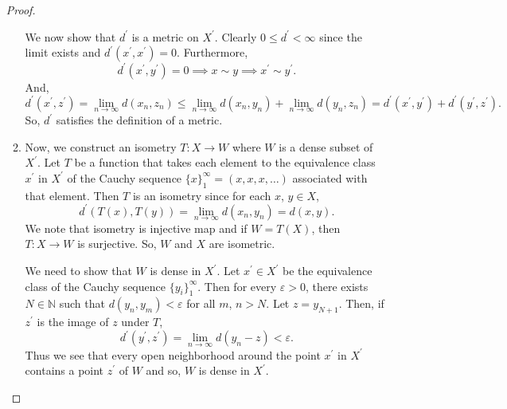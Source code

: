 \documentclass[12pt]{article}
\newcommand{\xprime}{X^\prime}
\begin{document}
\begin{enumerate}
\begin{mybox}
\begin{proof}
\begin{enumerate}
            \vspace*{3mm}
            We now show that $d^\prime$ is a metric on
            $\xprime$. Clearly $0\leq d^\prime<\infty$ since
            the limit exists and $d^\prime(x^\prime,
            x^\prime)=0$. Furthermore,
            $$d^\prime(x^\prime,
            y^\prime)=0\implies x\sim y\implies x^\prime
            \sim y^\prime.$$
            And,
            $$d^\prime(x^\prime,z^\prime)=
            \lim_{n\to\infty}{d(x_n,z_n)}\leq
            \lim_{n\to\infty}{d(x_n,y_n)}+
            \lim_{n\to\infty}{d(y_n,z_n)}
            =d^\prime(x^\prime,y^\prime)+
            d^\prime(y^\prime,z^\prime).$$
            So, $d^\prime$ satisfies the definition of a metric.
    
            \vspace*{3mm}
            \item Now, we construct an isometry
            $T:X\to W$ where $W$ is a dense subset of
            $\xprime$. Let $T$ be a function that takes
            each element to the
            equivalence
            class $x^\prime$ in $\xprime$ of the
            Cauchy sequence $\{x\}_1^\infty=
            (x,x,x,\ldots)$ associated with that element.
            Then $T$ is an isometry since for each
            $x$, $y\in X$,
            $$d^\prime(T(x),T(y))=\lim_{n\to\infty}
            {d(x_n,y_n)}=d(x,y).$$
            We note that isometry is injective map and
            if $W=T(X)$, then $T:X\to W$ is surjective. So,
            $W$ and $X$ are isometric.
    
            \vspace*{3mm}
            We need to show that $W$ is dense in $\xprime$.
            Let $x^\prime\in \xprime$ be the equivalence
            class of the Cauchy sequence $\{y_i\}_1^\infty$.
            Then for every $\varepsilon>0$, there exists $N
            \in \mathbb{N}$ such that
            $d(y_n,y_m)<\varepsilon$ for all $m$, $n>N$.
            Let $z=y_{N+1}$. Then, if $z^\prime$ is the image
            of $z$ under $T$,
            $$d^\prime(y^\prime,z^\prime)=
            \lim_{n\to\infty}{d(y_n-z)}<\varepsilon.$$
            Thus we see that every open neighborhood
            around the point $x^\prime$ in $\xprime$
            contains a point $z^\prime$ of $W$ and so,
            $W$ is dense in $\xprime$.


\end{enumerate}
\end{proof}
\end{mybox}
\end{enumerate}
\end{document}

